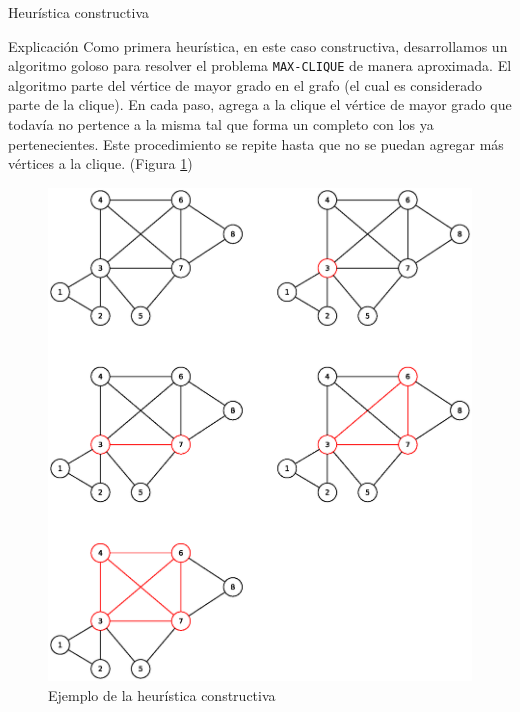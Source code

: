 
\begin{section}{Heurística constructiva}
		\begin{subsection}{Explicación}
			Como primera heurística, en este caso constructiva, desarrollamos un algoritmo goloso para resolver el problema \texttt{MAX-CLIQUE} de manera aproximada. El algoritmo parte del vértice de mayor grado en el grafo (el cual es considerado parte de la clique). En cada paso, agrega a la clique el vértice de mayor grado que todavía no pertence a la misma tal que forma un completo con los ya pertenecientes. Este procedimiento se repite hasta que no se puedan agregar más vértices a la clique. (Figura \ref{fig:seguimiento_constructivo})
			
			\begin{figure}[H]
				\centering
		    	\includegraphics[scale=0.5]{constructivo/seguimiento.eps}
			    \caption{Ejemplo de la heurística constructiva}
			    \label{fig:seguimiento_constructivo}
			\end{figure}
			

\end{subsection}
\end{section}
